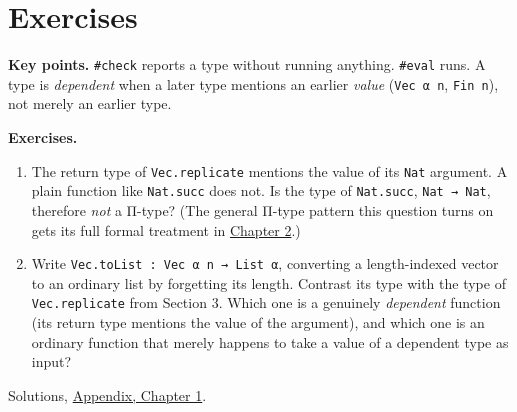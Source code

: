 \section{Exercises}\label{sec:01-basics:04-exercises:1}

\textbf{Key points.} \texttt{\#check} reports a type without running anything. \texttt{\#eval} runs. A type is \emph{dependent} when a later type mentions an earlier \emph{value} (\texttt{Vec α n}, \texttt{Fin n}), not merely an earlier type.

\textbf{Exercises.}

\begin{enumerate}
\def\labelenumi{\arabic{enumi}.}
\item
  The return type of \texttt{Vec.replicate} mentions the value of its \texttt{Nat} argument. A plain function like \texttt{Nat.succ} does not. Is the type of \texttt{Nat.succ}, \texttt{Nat → Nat}, therefore \emph{not} a Π-type? (The general Π-type pattern this question turns on gets its full formal treatment in \hyperref[sec:02-terminology-and-coc:00-index:1]{Chapter 2}.)
\item
  Write \texttt{Vec.toList : Vec α n → List α}, converting a length-indexed vector to an ordinary list by forgetting its length. Contrast its type with the type of \texttt{Vec.replicate} from Section 3. Which one is a genuinely \emph{dependent} function (its return type mentions the value of the argument), and which one is an ordinary function that merely happens to take a value of a dependent type as input?
\end{enumerate}

Solutions, \hyperref[sec:15-appendix-solutions:01-chapter-1:1]{Appendix, Chapter 1}.
